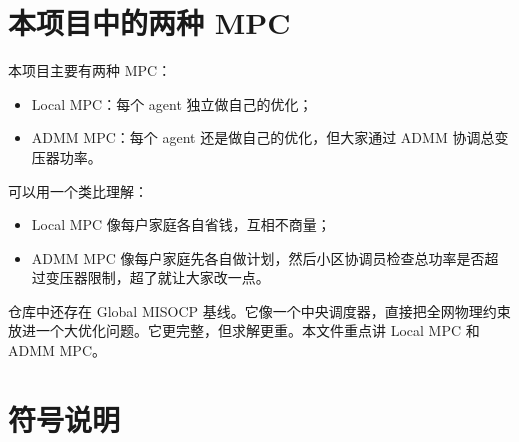\documentclass[UTF8,zihao=-4]{ctexart}
\begin{document}
\section{本项目中的两种 MPC}

本项目主要有两种 MPC：
\begin{itemize}
  \item Local MPC：每个 agent 独立做自己的优化；
  \item ADMM MPC：每个 agent 还是做自己的优化，但大家通过 ADMM 协调总变压器功率。
\end{itemize}

可以用一个类比理解：
\begin{itemize}
  \item Local MPC 像每户家庭各自省钱，互相不商量；
  \item ADMM MPC 像每户家庭先各自做计划，然后小区协调员检查总功率是否超过变压器限制，超了就让大家改一点。
\end{itemize}

仓库中还存在 Global MISOCP 基线。它像一个中央调度器，直接把全网物理约束放进一个大优化问题。它更完整，但求解更重。本文件重点讲 Local MPC 和 ADMM MPC。

\section{符号说明}
\end{document}
